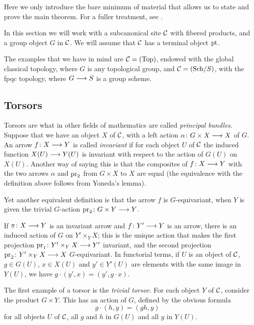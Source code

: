 \begin{4   STACKS}
\begin{4.4 Descent along torsors}
Here we only introduce the bare minimum of material that allows us to state and prove the main theorem. For a fuller treatment, see \cite{demazure-gabriel}.

In this section we will work with a subcanonical site $\mathcal{C}$ with fibered products, and a group object $G$ in $\mathcal{C}$. We will assume that $\mathcal{C}$ has a terminal object $\mathrm{pt}$.

The examples that we have in mind are $\mathcal{C} = (\mathrm{Top})$, endowed with the global classical topology, where $G$ is any topological group, and $\mathcal{C} = ({\mathrm{Sch}/S})$, with the fpqc topology, where $G \arr S$ is a group scheme.


\subsection{Torsors}

Torsors are what in other fields of mathematics are called \emph{principal bundles}. Suppose that we have an object $X$ of $\mathcal{C}$, with a left action $\alpha \colon G \times X \arr X$ of $G$. An arrow $f\colon X \arr Y$ is called \emph{invariant} if for each object $U$ of $\mathcal{C}$ the induced function $X(U) \arr Y(U)$ is invariant with respect to the action of $G(U)$ on $X(U)$. Another way of saying this is that the composites of $f\colon X \arr Y$ with the two arrows $\alpha$ and $\operatorname{pr}_2$ from $G \times X$ to $X$ are equal (the equivalence with the definition above follows from Yoneda's lemma).

Yet another equivalent definition is that the arrow $f$ is $G$-equivariant, when $Y$ is given the trivial $G$-action $\pr_2 \colon G \times Y \arr Y$.

If $\pi \colon X \arr Y$ is an invariant arrow and $f \colon Y' \arr Y$ is an arrow, there is an induced action of $G$ on $Y' \times_{Y} X$; this is the unique action that makes the first projection $\pr_1 \colon Y' \times_{Y} X \arr Y'$ invariant, and the second projection $\pr_2 \colon Y' \times_{Y} X \arr X$ $G$-equivariant. In functorial terms, if $U$ is an object of $\mathcal{C}$, $g \in G(U)$, $x \in X(U)$ and $y' \in Y'(U)$ are elements with the same image in $Y(U)$, we have $g \cdot (y', x) = (y', g \cdot x)$.

The first example of a torsor is the \emph{trivial torsor}. For each object $Y$ of $\mathcal{C}$, consider the product $G \times Y$. This has an action of $G$, defined by the obvious formula
   \[
   g \cdot (h, y) = (gh,y)
   \]
for all objects $U$ of $\mathcal{C}$, all $g$ and $h$ in $G(U)$ and all $y$ in $Y(U)$.


\end{4.4 Descent along torsors}
\end{4   STACKS}
